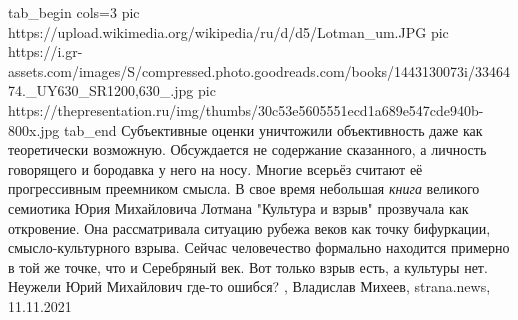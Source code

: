 \ifcmt
  tab_begin cols=3
     pic https://upload.wikimedia.org/wikipedia/ru/d/d5/Lotman_um.JPG
     pic https://i.gr-assets.com/images/S/compressed.photo.goodreads.com/books/1443130073i/3346474._UY630_SR1200,630_.jpg
		 pic https://thepresentation.ru/img/thumbs/30c53e5605551ecd1a689e547cde940b-800x.jpg
  tab_end
\fi
Субъективные оценки уничтожили объективность даже как теоретически возможную.
Обсуждается не содержание сказанного, а личность говорящего и бородавка у него
на носу. Многие всерьёз считают её прогрессивным преемником смысла.  В свое
время небольшая \emph{книга} великого семиотика Юрия Михайловича Лотмана
"Культура и взрыв" прозвучала как откровение.  Она рассматривала ситуацию
рубежа веков как точку бифуркации, смысло-культурного взрыва.  Сейчас
человечество формально находится примерно в той же точке, что и Серебряный век.
Вот только взрыв есть, а культуры нет.  Неужели Юрий Михайлович где-то ошибся?
, 
Владислав Михеев, strana.news, 11.11.2021

